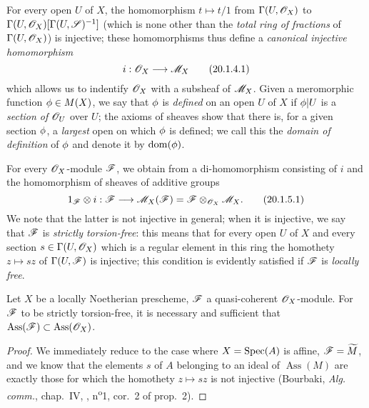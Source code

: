 \begin{env}[20.1.4]
\label{IV.20.1.4}
For every open $U$ of $X$, the homomorphism $t\mapsto t/1$ from $\Gamma(U,\mathscr{O}_X)$ to $\Gamma(U,\mathscr{O}_X)[\Gamma(U,\mathscr{S})^{-1}]$ (which is none other than the \emph{total ring of fractions} of
$\Gamma(U,\mathscr{O}_X)$) is injective;
these homomorphisms thus define a \emph{canonical injective homomorphism}
\[
\label{IV.20.1.4.1}
  i:\sh{O}_X\to\sh{M}_X
  \tag{20.1.4.1}
\]
which allows us to indentify $\mathscr{O}_X$ with a subsheaf of $\mathscr{M}_X$.
Given a meromorphic function $\phi\in M(X)$, we say that $\phi$ is \emph{defined} on an open $U$ of $X$ if $\phi|U$ is a \emph{section of $\mathscr{O}_U$} over $U$;
the axioms of sheaves show that there is, for a given section $\phi$, a \emph{largest} open on which $\phi$ is defined;
we call this the \emph{domain of definition} of $\phi$ and denote it by $\operatorname{dom}(\phi)$.
\end{env}

\begin{env}[20.1.5]
\label{IV.20.1.5}
For every $\mathscr{O}_X$-module $\mathscr{F}$, we obtain from  a di-homomorphism consisting of $i$ and the homomorphism of sheaves of additive groups
\[
\label{IV.20.1.5.1}
  1_\sh{F}\otimes i:\sh{F}\to\sh{M}_X(\sh{F})=\sh{F}\otimes_{\sh{O}_X}\sh{M}_X.
  \tag{20.1.5.1}
\]
We note that the latter is not injective in general;
when it is injective, we say that $\mathscr{F}$ is \emph{strictly torsion-free}: this means that for every open $U$ of $X$ and every section $s\in\Gamma(U,\mathscr{O}_X)$ which is a regular element in this ring the homothety $z\mapsto sz$ of $\Gamma(U,\mathscr{F})$ is injective;
this condition is evidently satisfied if $\mathscr{F}$ is \emph{locally free}.
\end{env}

\begin{proposition}[20.1.6]
\label{IV.20.1.6}
Let $X$ be a locally Noetherian prescheme, $\mathscr{F}$ a quasi-coherent $\mathscr{O}_X$-module.
For $\mathscr{F}$ to be strictly torsion-free, it is necessary and sufficient that $\operatorname{Ass}(\mathscr{F})\subset\operatorname{Ass}(\mathscr{O}_X)$.
\end{proposition}
 
\begin{proof}
We immediately reduce to the case where $X=\operatorname{Spec}(A)$ is affine, $\mathscr{F}=\widetilde{M}$, and we know that the elements $s$ of $A$ belonging to an ideal of $\operatorname{Ass}(M)$ are exactly those for which the homothety $z\mapsto sz$ is not injective (Bourbaki, \emph{Alg. comm.}, chap.~IV, , n\textsuperscript{o}1, cor.~2 of prop.~2).
\end{proof}

